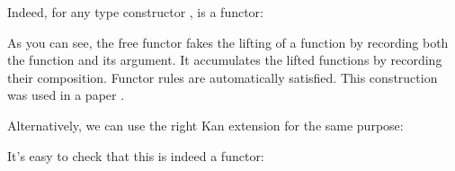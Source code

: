 Indeed, for any type constructor ,  is a
functor:

As you can see, the free functor fakes the lifting of a function by
recording both the function and its argument. It accumulates the lifted
functions by recording their composition. Functor rules are
automatically satisfied. This construction was used in a paper
.

Alternatively, we can use the right Kan extension for the same purpose:

It's easy to check that this is indeed a functor:

